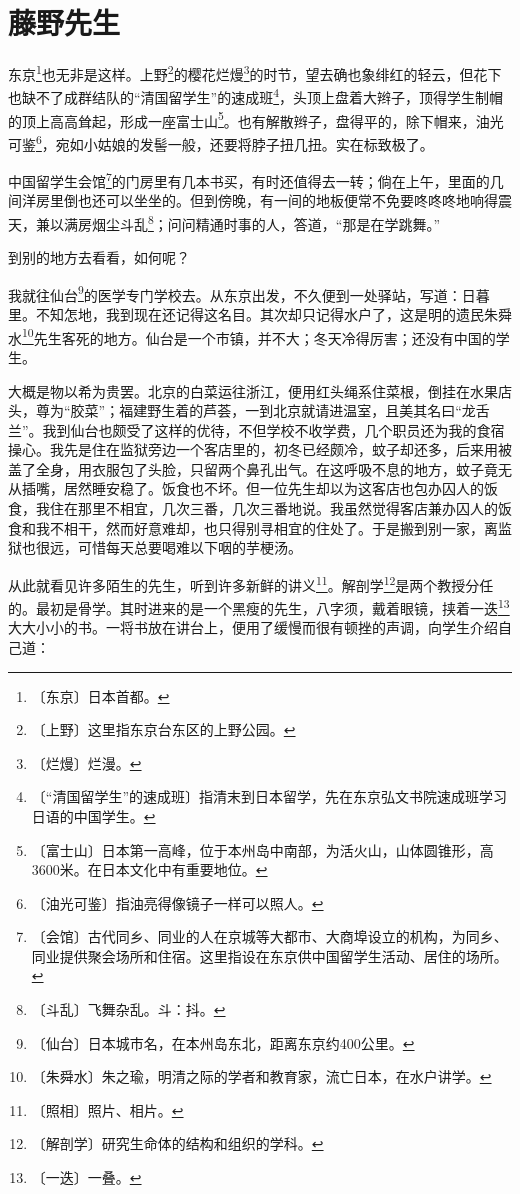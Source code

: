 \documentclass[12pt,UTF-8,openany]{ctexbook}
\begin{document}
\chapter{藤野先生}

\begin{normalsize}
    
    东京\footnote{〔东京〕日本首都。}也无非是这样。上野\footnote{〔上野〕这里指东京台东区的上野公园。}的樱花烂熳\footnote{〔烂熳〕烂漫。}的时节，望去确也象绯红的轻云，但花下也缺不了成群结队的“清国留学生”的速成班\footnote{〔“清国留学生”的速成班〕指清末到日本留学，先在东京弘文书院速成班学习日语的中国学生。}，头顶上盘着大辫子，顶得学生制帽的顶上高高耸起，形成一座富士山\footnote{〔富士山〕日本第一高峰，位于本州岛中南部，为活火山，山体圆锥形，高3600米。在日本文化中有重要地位。}。也有解散辫子，盘得平的，除下帽来，油光可鉴\footnote{〔油光可鉴〕指油亮得像镜子一样可以照人。}，宛如小姑娘的发髻一般，还要将脖子扭几扭。实在标致极了。
    
    中国留学生会馆\footnote{〔会馆〕古代同乡、同业的人在京城等大都市、大商埠设立的机构，为同乡、同业提供聚会场所和住宿。这里指设在东京供中国留学生活动、居住的场所。}的门房里有几本书买，有时还值得去一转；倘在上午，里面的几间洋房里倒也还可以坐坐的。但到傍晚，有一间的地板便常不免要咚咚咚地响得震天，兼以满房烟尘斗乱\footnote{〔斗乱〕飞舞杂乱。斗：抖。}；问问精通时事的人，答道，“那是在学跳舞。”
    
    到别的地方去看看，如何呢？
    
    我就往仙台\footnote{〔仙台〕日本城市名，在本州岛东北，距离东京约400公里。}的医学专门学校去。从东京出发，不久便到一处驿站，写道：日暮里。不知怎地，我到现在还记得这名目。其次却只记得水户了，这是明的遗民朱舜水\footnote{〔朱舜水〕朱之瑜，明清之际的学者和教育家，流亡日本，在水户讲学。}先生客死的地方。仙台是一个市镇，并不大；冬天冷得厉害；还没有中国的学生。
    
    大概是物以希为贵罢。北京的白菜运往浙江，便用红头绳系住菜根，倒挂在水果店头，尊为“胶菜”；福建野生着的芦荟，一到北京就请进温室，且美其名曰“龙舌兰”。我到仙台也颇受了这样的优待，不但学校不收学费，几个职员还为我的食宿操心。我先是住在监狱旁边一个客店里的，初冬已经颇冷，蚊子却还多，后来用被盖了全身，用衣服包了头脸，只留两个鼻孔出气。在这呼吸不息的地方，蚊子竟无从插嘴，居然睡安稳了。饭食也不坏。但一位先生却以为这客店也包办囚人的饭食，我住在那里不相宜，几次三番，几次三番地说。我虽然觉得客店兼办囚人的饭食和我不相干，然而好意难却，也只得别寻相宜的住处了。于是搬到别一家，离监狱也很远，可惜每天总要喝难以下咽的芋梗汤。
    
    从此就看见许多陌生的先生，听到许多新鲜的讲义\footnote{〔照相〕照片、相片。}。解剖学\footnote{〔解剖学〕研究生命体的结构和组织的学科。}是两个教授分任的。最初是骨学。其时进来的是一个黑瘦的先生，八字须，戴着眼镜，挟着一迭\footnote{〔一迭〕一叠。}大大小小的书。一将书放在讲台上，便用了缓慢而很有顿挫的声调，向学生介绍自己道：
    

\end{normalsize}
\end{document}
